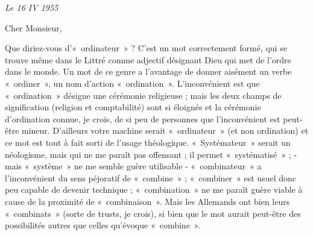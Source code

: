 {\em
Le 16 IV 1955

Cher Monsieur,

Que diriez-vous d'«~ordinateur~» ? C'est un mot correctement formé, qui se trouve même dans le
Littré comme adjectif désignant Dieu qui met de l'ordre dans le monde. Un mot de ce genre a
l'avantage de donner aisément un verbe «~ordiner~», un nom d'action «~ordination~». L'inconvénient
est que «~ordination~» désigne une cérémonie religieuse ; mais les deux champs de signification
(religion et comptabilité) sont si éloignés et la cérémonie d'ordination connue, je crois, de si peu de
personnes que l'inconvénient est peut-être mineur. D'ailleurs votre machine serait «~ordinateur~» (et
non ordination) et ce mot est tout à fait sorti de l'usage théologique. «~Systémateur~» serait un
néologisme, mais qui ne me paraît pas offensant ; il permet «~systématisé~» ; - mais «~système~» ne
me semble guère utilisable - «~combinateur~» a l'inconvénient du sens péjoratif de «~combine~» ;
«~combiner~» est usuel donc peu capable de devenir technique ; «~combination~» ne me paraît guère
viable à cause de la proximité de «~combinaison~». Mais les Allemands ont bien leurs «~combinats~»
(sorte de trusts, je crois), si bien que le mot aurait peut-être des possibilités autres que celles
qu'évoque «~combine~».

}

